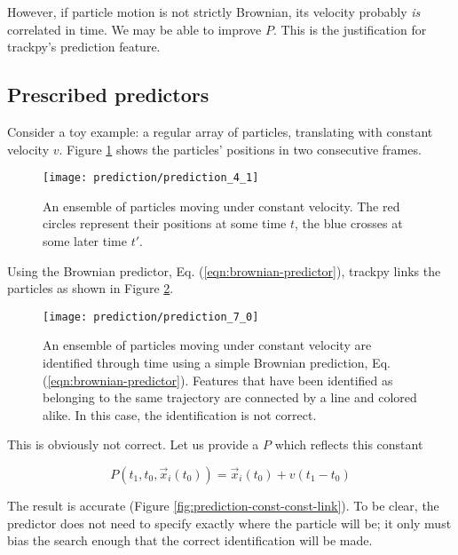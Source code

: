 However, if particle motion is not strictly Brownian, its velocity
probably \emph{is} correlated in time. We may be able to improve $P$. This 
is the justification for trackpy's prediction feature.

\subsection{Prescribed predictors}\label{prescribed-predictors}

Consider a toy example: a regular array of particles,
translating with constant velocity $v$. Figure \ref{fig:prediction-const-features}
shows the particles' positions in two consecutive frames.

    \begin{figure}
    \centering
    \texttt{[image: prediction/prediction\_4\_1]}
    \caption{\label{fig:prediction-const-features}An ensemble of particles moving under constant velocity. The red circles represent their positions at some time $t$, the blue crosses at some later time $t'$.}
    \end{figure}

\noindent Using the Brownian predictor, Eq. (\ref{eqn:brownian-predictor}), trackpy links the particles as shown in Figure \ref{fig:prediction-const-brownian-link}.

   \begin{figure}
    \centering
    \texttt{[image: prediction/prediction\_7\_0]}
    \caption{\label{fig:prediction-const-brownian-link}An ensemble of particles moving under constant velocity are identified through time using a simple Brownian prediction, Eq. (\ref{eqn:brownian-predictor}). Features that have been identified as belonging to the same trajectory are connected by a line and colored alike. In this case, the identification is not correct.}
    \end{figure}
    
\noindent This is obviously not correct. Let us provide a $P$ which reflects this constant

\begin{equation}
\label{eqn:const-predictor}
P(t_1, t_0, \vec x_i(t_0)) = \vec x_i(t_0) + v(t_1 - t_0)
\end{equation}

\noindent The result is accurate (Figure \ref{fig:prediction-const-const-link}). To be clear, the predictor does not need to specify exactly where the
particle will be; it only must bias the search enough that the correct
identification will be made.

